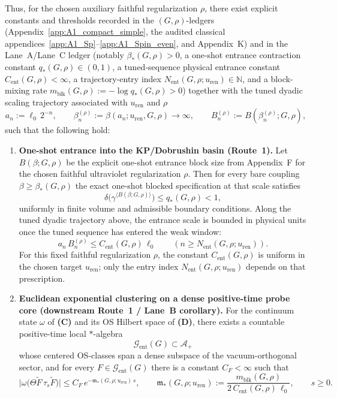 \begin{theorem}
Thus, for the chosen auxiliary faithful regularization $\rho$, there exist explicit constants and thresholds recorded in the $(G,\rho)$-ledgers (Appendix~\ref{app:A1_compact_simple}, the audited classical appendices~\ref{app:A1_Sp}--\ref{app:A1_Spin_even}, and Appendix~K) and in the Lane~A/Lane~C ledger
(notably $\beta_\ast(G,\rho)>0$, a one-shot entrance contraction constant $q_\ast(G,\rho)\in(0,1)$, a tuned-sequence physical entrance constant $C_{\mathrm{ent}}(G,\rho)<\infty$,
a trajectory-entry index $N_{\mathrm{ent}}(G,\rho;u_{\mathrm{ren}})\in\mathbb N$, and a block-mixing rate $m_{\mathrm{blk}}(G,\rho):=-\log q_\ast(G,\rho)>0$)
together with the tuned dyadic scaling trajectory associated with $u_{\mathrm{ren}}$ and $\rho$
\[
a_n:=\ell_0\,2^{-n},\qquad \beta_n^{(\rho)}:=\beta(a_n;u_{\mathrm{ren}},G,\rho)\to\infty,\qquad B_n^{(\rho)}:=B(\beta_n^{(\rho)};G,\rho),
\]
such that the following hold:

\begin{enumerate}[label=\textbf{(\Alph*)},leftmargin=2.2em]
\item \textbf{One-shot entrance into the KP/Dobrushin basin (Route~1).}
Let $B(\beta;G,\rho)$ be the explicit one-shot entrance block size from Appendix~F for the chosen faithful ultraviolet regularization $\rho$.
Then for every bare coupling $\beta\ge \beta_\ast(G,\rho)$ the exact one-shot blocked specification at that scale satisfies
\[
\delta\!\bigl(\gamma^{\langle B(\beta;G,\rho)\rangle}\bigr)\le q_\ast(G,\rho)<1,
\]
uniformly in finite volume and admissible boundary conditions.
Along the tuned dyadic trajectory above, the entrance scale is bounded in physical units once the tuned sequence has entered the weak window:
\[
a_n\,B_n^{(\rho)}\le C_{\mathrm{ent}}(G,\rho)\,\ell_0
\qquad (n\ge N_{\mathrm{ent}}(G,\rho;u_{\mathrm{ren}})).
\]
For this fixed faithful regularization $\rho$, the constant $C_{\mathrm{ent}}(G,\rho)$ is uniform in the chosen target $u_{\mathrm{ren}}$; only the entry index $N_{\mathrm{ent}}(G,\rho;u_{\mathrm{ren}})$ depends on that prescription.

\item \textbf{Euclidean exponential clustering on a dense positive-time probe core (downstream Route~1 / Lane~B corollary).}
For the continuum state $\omega$ of \textbf{(C)} and its OS Hilbert space of \textbf{(D)}, there exists a countable positive-time local $*$-algebra
\[
\mathcal G_{\mathrm{ent}}(G)\subset \mathcal A_+
\]
whose centered OS-classes span a dense subspace of the vacuum-orthogonal sector, and for every $F\in\mathcal G_{\mathrm{ent}}(G)$ there is a constant $C_F<\infty$ such that
\[
\big|\omega\big(\Theta \widetilde F\,\tau_s\widetilde F\big)\big|
\le C_F\,e^{-\mathfrak m_\ast(G,\rho;u_{\mathrm{ren}})\, s},
\qquad
\mathfrak m_\ast(G,\rho;u_{\mathrm{ren}}):=\frac{m_{\mathrm{blk}}(G,\rho)}{2\,C_{\mathrm{ent}}(G,\rho)\,\ell_0},
\qquad s\ge 0.
\]


\end{enumerate}
\end{theorem}
